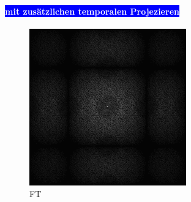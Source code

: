 \begin{figure}[H]
\begin{tcolorbox}[boxrule=4pt,sharp corners=downhill,title=Szene unter Kamerabewegung, fonttitle=\bfseries]
\begin{subfigure}[b]{0.2\linewidth}
         \caption{}
         \label{pic:NoTemporalRepr_4}
    \end{subfigure}
    \tcblower
    \paragraph{\hfill\colorbox{blue}{\textcolor{white}{mit zusätzlichen temporalen Projezieren}}}
    \centering
    \begin{subfigure}[b]{0.2\linewidth}
      \includegraphics[width=\linewidth]{content/TemporalerAlg/Bilder/Reprojection/TemporalRepr/Ausschnitte/Ausschnitt1_FFT.png}
       \caption{FT}
       \label{pic:TemporalRepr_1_FFT}
    \end{subfigure}
    \begin{subfigure}[b]{0.2\linewidth}

\end{subfigure}
\end{tcolorbox}
\end{figure}
